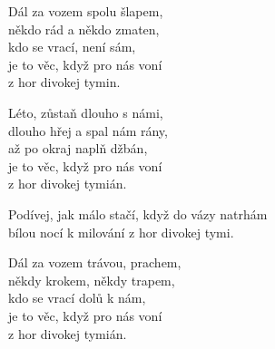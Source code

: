 
\ve{}
Dál za vozem spolu šlapem,\\
někdo rád a někdo zmaten,\\
kdo se vrací, není sám,\\
je to věc, když pro nás voní\\
z hor divokej tymin.

\ve{} 
Léto, zůstaň dlouho s námi,\\
dlouho hřej a spal nám rány,\\
až po okraj naplň džbán,\\
je to věc, když pro nás voní\\
z hor divokej tymián.

\cho{}
Podívej, jak málo stačí, když do vázy natrhám\\
bílou nocí k milování z hor divokej tymi.

\ve{} 
Dál za vozem trávou, prachem,\\
někdy krokem, někdy trapem,\\
kdo se vrací dolů k nám,\\
je to věc, když pro nás voní\\
z hor divokej tymián.


\esong
